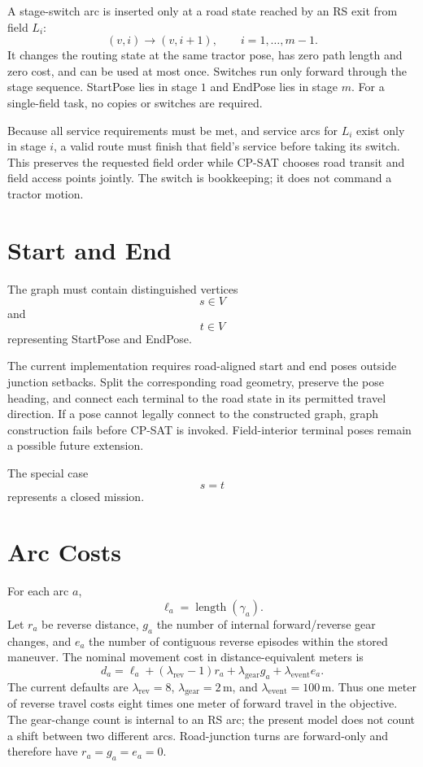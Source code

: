 \documentclass{article}
\begin{document}
A stage-switch arc is inserted only at a road state reached by an RS exit from field $L_i$:
\[
(v,i)\longrightarrow(v,i+1),\qquad i=1,\ldots,m-1.
\]
It changes the routing state at the same tractor pose, has zero path length and zero cost, and can be used at most once. Switches run only forward through the stage sequence. StartPose lies in stage $1$ and EndPose lies in stage $m$. For a single-field task, no copies or switches are required.

Because all service requirements must be met, and service arcs for $L_i$ exist only in stage $i$, a valid route must finish that field's service before taking its switch. This preserves the requested field order while CP-SAT chooses road transit and field access points jointly. The switch is bookkeeping; it does not command a tractor motion.

\section{Start and End}

The graph must contain distinguished vertices
$$
s\in V
$$
and
$$
t\in V
$$
representing StartPose and EndPose.

The current implementation requires road-aligned start and end poses outside junction setbacks. Split the corresponding road geometry, preserve the pose heading, and connect each terminal to the road state in its permitted travel direction. If a pose cannot legally connect to the constructed graph, graph construction fails before CP-SAT is invoked. Field-interior terminal poses remain a possible future extension.

The special case
$$
s=t
$$
represents a closed mission.

\section{Arc Costs}

For each arc $a$,
$$
\ell_a = \operatorname{length}(\gamma_a).
$$
Let $r_a$ be reverse distance, $g_a$ the number of internal forward/reverse gear changes, and $e_a$ the number of contiguous reverse episodes within the stored maneuver. The nominal movement cost in distance-equivalent meters is
\[
d_a=\ell_a+(\lambda_{\mathrm{rev}}-1)r_a
       +\lambda_{\mathrm{gear}}g_a
       +\lambda_{\mathrm{event}}e_a.
\]
The current defaults are $\lambda_{\mathrm{rev}}=8$, $\lambda_{\mathrm{gear}}=2\,$m, and $\lambda_{\mathrm{event}}=100\,$m. Thus one meter of reverse travel costs eight times one meter of forward travel in the objective. The gear-change count is internal to an RS arc; the present model does not count a shift between two different arcs. Road-junction turns are forward-only and therefore have $r_a=g_a=e_a=0$.
\end{document}
